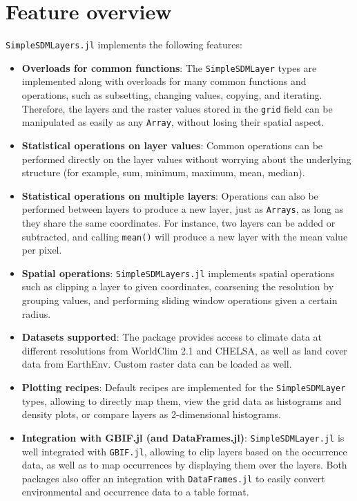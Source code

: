 \documentclass[
]{article}
\providecommand{\tightlist}{%
  \setlength{\itemsep}{0pt}\setlength{\parskip}{0pt}}
\begin{document}
\hypertarget{feature-overview}{%
\section{Feature overview}\label{feature-overview}}

\texttt{SimpleSDMLayers.jl} implements the following
features:

\begin{itemize}
\tightlist
\item
  \textbf{Overloads for common functions}: The
  \texttt{SimpleSDMLayer} types are implemented along with
  overloads for many common functions and operations, such as
  subsetting, changing values, copying, and iterating. Therefore, the
  layers and the raster values stored in the \texttt{grid}
  field can be manipulated as easily as any \texttt{Array},
  without losing their spatial aspect.
\item
  \textbf{Statistical operations on layer values}: Common operations can
  be performed directly on the layer values without worrying about the
  underlying structure (for example, sum, minimum, maximum, mean,
  median).
\item
  \textbf{Statistical operations on multiple layers}: Operations can
  also be performed between layers to produce a new layer, just as
  \texttt{Arrays}, as long as they share the same
  coordinates. For instance, two layers can be added or subtracted, and
  calling \texttt{mean()} will produce a new layer with the
  mean value per pixel.
\item
  \textbf{Spatial operations}: \texttt{SimpleSDMLayers.jl}
  implements spatial operations such as clipping a layer to given
  coordinates, coarsening the resolution by grouping values, and
  performing sliding window operations given a certain radius.
\item
  \textbf{Datasets supported}: The package provides access to climate
  data at different resolutions from WorldClim 2.1 and CHELSA, as well
  as land cover data from EarthEnv. Custom raster data can be loaded as
  well.
\item
  \textbf{Plotting recipes}: Default recipes are implemented for the
  \texttt{SimpleSDMLayer} types, allowing to directly map
  them, view the grid data as histograms and density plots, or compare
  layers as 2-dimensional histograms.
\item
  \textbf{Integration with GBIF.jl (and DataFrames.jl)}:
  \texttt{SimpleSDMLayer.jl} is well integrated with
  \texttt{GBIF.jl}, allowing to clip layers based on the
  occurrence data, as well as to map occurrences by displaying them over
  the layers. Both packages also offer an integration with
  \texttt{DataFrames.jl} to easily convert environmental and
  occurrence data to a table format.
\end{itemize}
\end{document}
